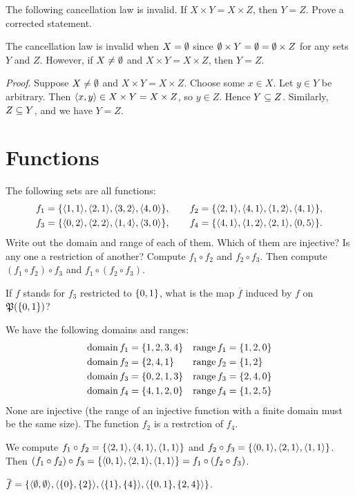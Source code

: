 \documentclass{report}
\begin{document}
\begin{exercise}
The following cancellation law is invalid. If $X \times Y = X \times Z$, then $Y = Z$.
Prove a corrected statement.
\end{exercise}

\begin{solution}
The cancellation law is invalid when $X=\emptyset$ since $\emptyset\times Y = \emptyset=\emptyset\times Z$
for any sets $Y$ and $Z$.
However, if $X\neq\emptyset$ and $X \times Y = X \times Z$, then $Y = Z$.

\textit{Proof}. Suppose $X\neq\emptyset$ and $X \times Y = X \times Z$. Choose some $x\in X$.
Let $y\in Y$ be arbitrary. Then $\left\langle x, y\right\rangle\in X \times Y = X \times Z$, so $y\in Z$.
Hence $Y\subseteq Z$. Similarly, $Z\subseteq Y$, and we have $Y=Z$.
\end{solution}


\section{Functions}
\begin{exercise}
The following sets are all functions:
\begin{gather*}
f_1 = \set{\aprn{1,1},\aprn{2,1},\aprn{3,2},\aprn{4,0}},\qquad f_2 = \set{\aprn{2,1},\aprn{4,1},\aprn{1,2},\aprn{4,1}},\\
f_3 = \set{\aprn{0,2},\aprn{2,2},\aprn{1,4},\aprn{3,0}},\qquad f_4 = \set{\aprn{4,1},\aprn{1,2},\aprn{2,1},\aprn{0,5}}.
\end{gather*}
Write out the domain and range of each of them. Which of them are injective? Is any
one a restriction of another? Compute $f_1\circ f_2$ and $f_2\circ f_3$. Then compute
$(f_1\circ f_2)\circ f_3$ and $f_1\circ(f_2\circ f_3)$.

If $f$ stands for $f_3$ restricted to $\left\{0,1\right\}$, what is the map $\overbar f$ induced by $f$
on $\operatorname{\mathfrak{P}}(\left\{0,1\right\})$?
\end{exercise}

\begin{solution}
We have the following domains and ranges:
\begin{align*}
\operatorname{domain} f_1 &= \left\{1, 2, 3, 4\right\} & \operatorname{range} f_1 &= \left\{1,2,0\right\} \\
\operatorname{domain} f_2 &= \left\{2, 4, 1\right\} & \operatorname{range} f_2 &= \left\{1,2\right\} \\
\operatorname{domain} f_3 &= \left\{0, 2, 1, 3\right\} & \operatorname{range} f_3 &= \left\{2,4,0\right\} \\
\operatorname{domain} f_4 &= \left\{4,1,2,0\right\} & \operatorname{range} f_4 &= \left\{1,2,5\right\}
\end{align*}
None are injective (the range of an injective function with a finite domain must be the same size).
The function $f_2$ is a restrction of $f_4$.

We compute $f_1\circ f_2=\set{\aprn{2,1},\aprn{4,1},\aprn{1,1}}$
and $f_2\circ f_3=\set{\aprn{0,1},\aprn{2,1},\aprn{1,1}}$.
Then $(f_1\circ f_2)\circ f_3=\set{\aprn{0,1},\aprn{2,1},\aprn{1,1}}=f_1\circ (f_2\circ f_3)$.

$\overbar f=\set{\aprn{\eset,\eset},\aprn{\set{0},\set{2}},\aprn{\set{1},\set{4}},\aprn{\set{0,1},\set{2,4}}}$.
\end{solution}
\end{document}
